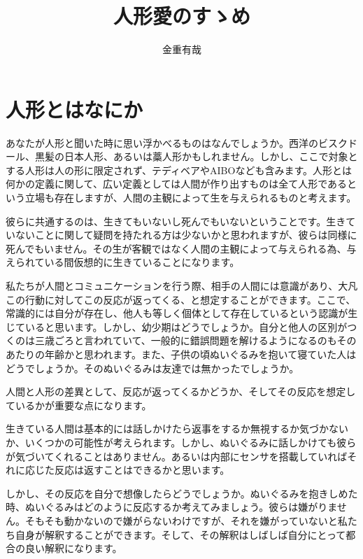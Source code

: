 \documentclass[b5j,twoside,twocolumn]{utarticle}
\title{人形愛のすゝめ}
\author{金重有哉}
\date{\vspace{-5mm}}
\makeatletter
\def\yakuchu{%
\@ifnextchar[\@xfootnote %
{\stepcounter{yakuchu}%
\protected@xdef\@thefnmark{\theyakuchu}%
\@footnotemark\@footnotetext}}
\makeatother
\begin{document}
\maketitle

\setlength{\footskip}{-2mm}
\chead[]{}
\rhead[人形愛のすゝめ]{}
\lfoot[]{\thepage{}}
\cfoot[]{}
\rfoot[\thepage{}]{}

\let\yakuchu=\endnote
\renewcommand{\footnoterule}{\noindent\rule{100mm}{0.3mm}\vskip2mm}
\thispagestyle{fancy}
\section{人形とはなにか}
あなたが人形と聞いた時に思い浮かべるものはなんでしょうか。西洋のビスクドール、黒髪の日本人形、あるいは藁人形かもしれません。しかし、ここで対象とする人形は人の形に限定されず、テディベアやAIBOなども含みます。人形とは何かの定義に関して、広い定義としては人間が作り出すものは全て人形であるという立場も存在しますが、人間の主観によって生を与えられるものと考えます。


彼らに共通するのは、生きてもいないし死んでもいないということです。生きていないことに関して疑問を持たれる方は少ないかと思われますが、彼らは同様に死んでもいません。その生が客観ではなく人間の主観によって与えられる為、与えられている間仮想的に生きていることになります。


私たちが人間とコミュニケーションを行う際、相手の人間には意識があり、大凡この行動に対してこの反応が返ってくる、と想定することができます。ここで、常識的には自分が存在し、他人も等しく個体として存在しているという認識が生じていると思います。しかし、幼少期はどうでしょうか。自分と他人の区別がつくのは三歳ごろと言われていて、一般的に錯誤問題を解けるようになるのもそのあたりの年齢かと思われます。また、子供の頃ぬいぐるみを抱いて寝ていた人はどうでしょうか。そのぬいぐるみは友達では無かったでしょうか。


人間と人形の差異として、反応が返ってくるかどうか、そしてその反応を想定しているかが重要な点になります。


生きている人間は基本的には話しかけたら返事をするか無視するか気づかないか、いくつかの可能性が考えられます。しかし、ぬいぐるみに話しかけても彼らが気づいてくれることはありません。あるいは内部にセンサを搭載していればそれに応じた反応は返すことはできるかと思います。


しかし、その反応を自分で想像したらどうでしょうか。ぬいぐるみを抱きしめた時、ぬいぐるみはどのように反応するか考えてみましょう。彼らは嫌がりません。そもそも動かないので嫌がらないわけですが、それを嫌がっていないと私たち自身が解釈することができます。そして、その解釈はしばしば自分にとって都合の良い解釈になります。
\end{document}
